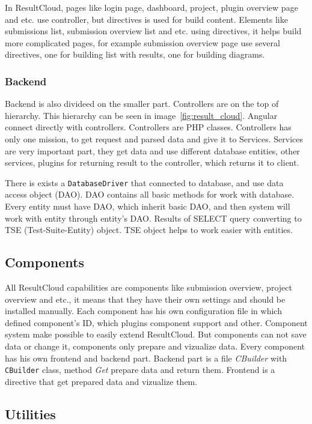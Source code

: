 In ResultCloud, pages like login page, dashboard, project, plugin overview page and etc. use controller, but directives is used for build content. Elements like submissions list, submission overview list and etc. using directives, it helps build more complicated pages, for example submission overview page use several directives, one for building list with results, one for building diagrams. 

\subsubsection{Backend}

Backend is also divideed on the smaller part. Controllers are on the top of hierarchy. This hierarchy can be seen in image\ \ref{fig:result_cloud}. Angular connect directly with controllers. Controllers are PHP classes. Controllers has only one mission, to get request and parsed data and give it to Services. Services are very important part, they get data and use different database entities, other services, plugins for returning result to the controller, which returns it to client.

There is exists a \texttt{DatabaseDriver} that connected to database, and use data access object (DAO). DAO contains all basic methods for work with database. Every entity must have DAO, which inherit basic DAO, and then system will work with entity through entity's DAO. Results of SELECT query converting to TSE (Test-Suite-Entity) object. TSE object helps to work easier with entities.


\subsection{Components}

All ResultCloud capabilities are components like submission overview, project overview and etc., it means that they have their own settings and should be installed manually. Each component has his own configuration file in which defined component's ID, which plugins component support and other. Component system make possible to easily extend ResultCloud. But components can not save data or change it, components only prepare and vizualize data. Every component has his own frontend and backend part. Backend part is a file \emph{CBuilder} with \texttt{CBuilder} class, method \emph{Get} prepare data and return them. Frontend is a directive that get prepared data and vizualize them.   

\subsection{Utilities}

